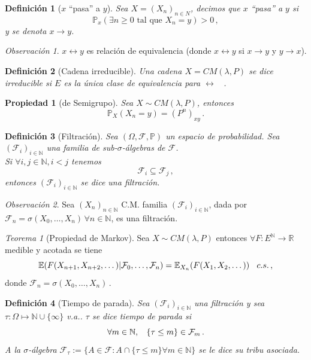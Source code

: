 \documentclass[letterpaper,11pt]{article} %
\def\espacio{\hspace{.25cm}\,}
\theoremstyle{defbreak}
\newtheorem{definition}{Definición}[subsection]
\theoremstyle{propbreak}
\newtheorem{property}{Propiedad}[subsection]
\theoremstyle{remark}
\newtheorem{remark}{Observación}[subsection]
\theoremstyle{break}
\newtheorem{theorem}{Teorema}[subsection]
\def\R{\mathbb{R}}
\def\E{\mathbb{E}}
\def\P{\mathbb{P}}
\def\N{\mathbb{N}}
\def\edp{(\Omega,\mathcal{F},\mathbb{P})}
\def\tq{\mbox{ tal que }}
\def\xcm{(X_n)_{n\in N}}
\def\cm{CM(\lambda,P)}
\begin{document}
\begin{definition}[$x$ ``pasa'' a $y$]
Sea $X=\xcm$, decimos que $x$ ``pasa'' a $y$ si
$$\P_x(\exists n\geq 0 \tq X_n=y)>0 \, ,$$
y se denota $x\longrightarrow y$.
\end{definition}
\begin{remark}
$x\longleftrightarrow y$ es relación de equivalencia (donde $x\longleftrightarrow y$ si $x\longrightarrow y$ y $y\longrightarrow x$).
\end{remark}
\begin{definition}[Cadena irreducible]
Una cadena $X=\cm$ se dice irreducible si $E$ es la única clase de equivalencia para $\longleftrightarrow$ \, .
\end{definition}
\begin{property}[de Semigrupo]
Sea $X\sim\cm$, entonces $$ \P_X(X_n=y)=(P^n)_{xy} \, .$$
\end{property}
\begin{definition}[Filtración]
Sea $\edp$ un espacio de probabilidad. Sea $(\mathcal{F}_i)_{i\in\N}$ una familia de sub-$\sigma$-álgebras de $\mathcal{F}$. \\ Si $\forall i,j\in\N, i<j$ tenemos $$\mathcal{F}_i\subseteq\mathcal{F}_j \, ,$$
entonces $(\mathcal{F}_i)_{i\in\N}$ se dice una filtración.
\end{definition}
\begin{remark}
Sea $(X_n)_{n\in\N}$ C.M. familia $(\mathcal{F}_i)_{i\in\N}$, dada por $\mathcal{F}_n=\sigma(X_0,\dots,X_n)\, \forall n\in\N$, es una filtración.
\end{remark}
\begin{theorem}[Propiedad de Markov]
Sea $X\sim\cm$ entonces $\forall F:E^\N \to \R$ medible y acotada se tiene
$$ \E(F(X_{n+1},X_{n+2},\dots)|\mathcal{F}_0,\dots,\mathcal{F}_n)=\E_{X_n}(F(X_1,X_2,\dots)) \espacio c.s.\, ,$$
donde $\mathcal{F}_n=\sigma(X_0,\dots,X_n)$\,.
\end{theorem}
\begin{definition}[Tiempo de parada]
Sea $(\mathcal{F}_i)_{i\in\N}$ una filtración y sea $\tau:\Omega\mapsto\N\cup\{\infty\}$ v.a.. $\tau$ se dice tiempo de parada si
$$\forall m\in\N,\espacio \{\tau\leq m\}\in\mathcal{F}_m \, .$$
\newline A la $\sigma$-álgebra $\mathcal{F}_\tau:=\{A\in\mathcal{F}:A\cap\{\tau\leq m\}\forall m \in \N\}$ se le dice su tribu asociada.
\end{definition}
\end{document}
